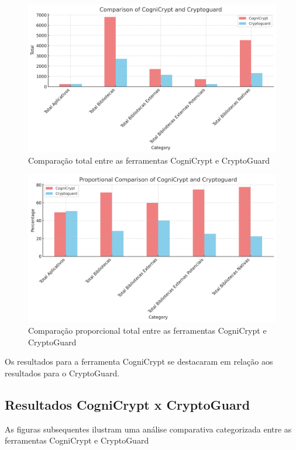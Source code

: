\begin{figure}[!ht]
  \centering
  \includegraphics[scale=0.7]{img/plot_cc_x_cg_summary.png}
  \caption{Comparação total entre as ferramentas CogniCrypt e CryptoGuard}
  \label{img: CCvsCG_Summary}
\end{figure}

\begin{figure}[!ht]
  \centering
  \includegraphics[scale=0.7]{img/plot_cc_x_cg_proportion_summary.png}
  \caption{Comparação proporcional total entre as ferramentas CogniCrypt e CryptoGuard}
  \label{img: CCvsCG_Summary2}
\end{figure}

Os resultados para a ferramenta CogniCrypt se destacaram em relação aos resultados para o CryptoGuard. 

\subsection{Resultados CogniCrypt x CryptoGuard}

As figuras subsequentes ilustram uma análise comparativa categorizada entre as ferramentas CogniCrypt e CryptoGuard


